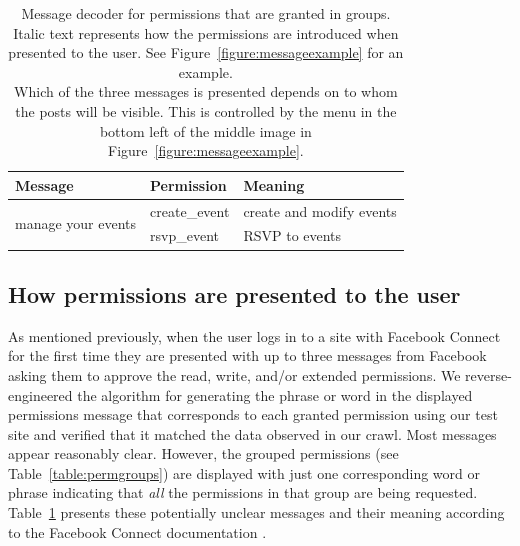 \documentclass{sig-alternate}
\newcommand{\extendedversion}[2]{#2}
\begin{document}
\begin{table}[htb]
\begin{tabular}{|l|l|l|}
    \textbf{Message}                                                                                                                                                                                                                                                 & \textbf{Permission} & \textbf{Meaning}                                                                                                                          \\ \hline
    \multirow{2}{*}{manage your events}                                                                                                                                                                                                                              & create\_event       & create and modify events                                                                                                                  \\ \cline{2-3} 
    & rsvp\_event         & RSVP to events                                                                                                                            \\ \hline
  \end{tabular}
  \caption{Message decoder for permissions that are granted in groups. \extendedversion{Decoder tables for all permissions are in Appendix~\ref{appendix:decodetables}.}{} Italic text represents how the permissions are introduced when presented to the user. See Figure~\ref{figure:messageexample} for an example. \\ \footnotesize *Which of the three messages is presented depends on to whom the posts will be visible. This is controlled by the menu in the bottom left of the middle image in Figure~\ref{figure:messageexample}.}
  \label{table:messagegrouped}
\end{table}
\subsection{How permissions are presented to the user} 
\label{sec:messages} 

As mentioned previously, when the user logs in to a site with Facebook Connect for the first time they are presented with up to three messages from Facebook asking them to approve the read, write, and/or extended permissions.
We reverse-engineered the algorithm for generating the phrase or word in the displayed permissions message that corresponds to each granted permission using our test site and verified that it matched the data observed in our crawl.
Most messages appear reasonably clear.
However, the grouped permissions (see Table~\ref{table:permgroups}) are displayed with just one corresponding word or phrase indicating that \emph{all} the permissions in that group are being requested. Table~\ref{table:messagegrouped} presents these potentially unclear messages and their meaning according to the Facebook Connect documentation \cite{fbpermissions}. \extendedversion{Similar tables for all permissions can be found in Appendix~\ref{appendix:decodetables}.}{}
\end{document}
